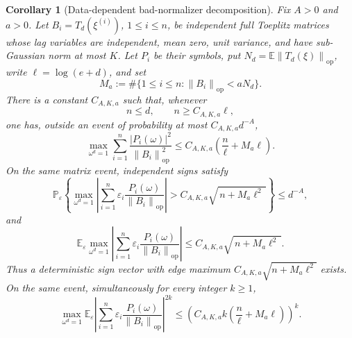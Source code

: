 \documentclass[11pt]{amsart}
\numberwithin{equation}{section}
\newtheorem{corollary}[theorem]{Corollary}
\theoremstyle{definition}
\theoremstyle{remark}
\newcommand{\op}{\mathrm{op}}
\newcommand{\Prob}{\mathbb P}
\newcommand{\Exp}{\mathbb E}
\newcommand{\norm}[1]{\left\lVert #1\right\rVert}
\newcommand{\abs}[1]{\left\lvert #1\right\rvert}
\newcommand{\eps}{\varepsilon}
\begin{document}
\begin{corollary}[Data-dependent bad-normalizer decomposition]
\label{cor:normalizer-tail-datadep}
Fix \(A>0\) and \(a>0\).  Let \(B_i=T_d(\xi^{(i)})\),
\(1\le i\le n\), be independent full Toeplitz matrices whose lag variables are
independent, mean zero, unit variance, and have sub-Gaussian norm at most \(K\).
Let \(P_i\) be their symbols, put
\(N_d=\Exp\norm{T_d(\xi)}_{\op}\), write \(\ell=\log(e+d)\), and set
\[
  M_a:=\#\{1\le i\le n:\norm{B_i}_{\op}<aN_d\}.
\]
There is a constant \(C_{A,K,a}\) such that, whenever
\[
  n\le d,\qquad n\ge C_{A,K,a}\ell ,
\]
one has, outside an event of probability at most \(C_{A,K,a}d^{-A}\),
\[
  \max_{\omega^d=1}
  \sum_{i=1}^n
  \frac{\abs{P_i(\omega)}^2}{\norm{B_i}_{\op}^2}
  \le
  C_{A,K,a}\left(\frac n\ell+M_a\ell\right).
\]
On the same matrix event, independent signs satisfy
\[
  \Prob_\eps\left\{
  \max_{\omega^d=1}\left|\sum_{i=1}^n
  \eps_i\frac{P_i(\omega)}{\norm{B_i}_{\op}}\right|
  > C_{A,K,a}\sqrt{\,n+M_a\ell^2\,}
  \right\}\le d^{-A},
\]
and
\[
  \Exp_\eps\max_{\omega^d=1}\left|\sum_{i=1}^n
  \eps_i\frac{P_i(\omega)}{\norm{B_i}_{\op}}\right|
  \le C_{A,K,a}\sqrt{\,n+M_a\ell^2\,}.
\]
Thus a deterministic sign vector with edge maximum
\(C_{A,K,a}\sqrt{n+M_a\ell^2}\) exists.  On the same event, simultaneously for
every integer \(k\ge1\),
\[
  \max_{\omega^d=1}
  \Exp_\eps\left|\sum_{i=1}^n
  \eps_i\frac{P_i(\omega)}{\norm{B_i}_{\op}}\right|^{2k}
  \le
  \left(C_{A,K,a}k\left(\frac n\ell+M_a\ell\right)\right)^k .
\]
\end{corollary}
\end{document}

